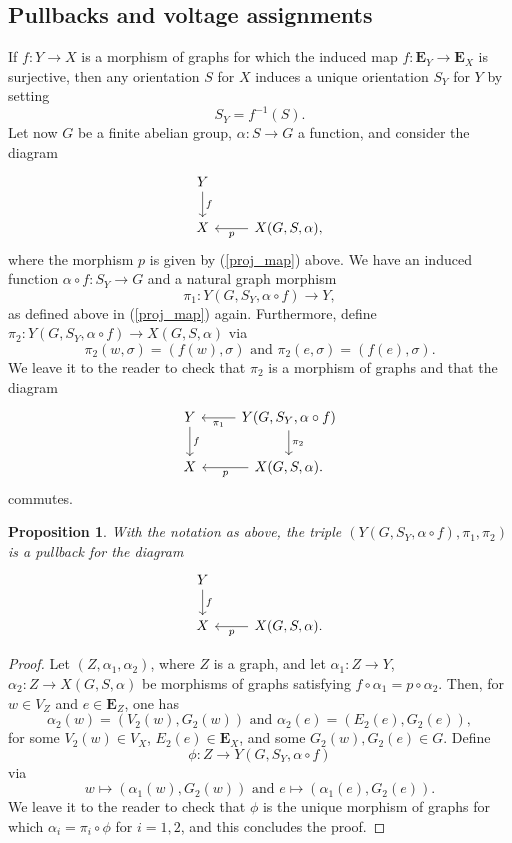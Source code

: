 \documentclass[11pt]{amsart}
\newtheorem{proposition}[theorem]{Proposition}
\numberwithin{equation}{section}
\theoremstyle{remark}
\begin{document}
\subsection{Pullbacks and voltage assignments} \label{pull_b_va}
If $f:Y\rightarrow X$ is a morphism of graphs for which the induced map $f:\mathbf{E}_{Y} \rightarrow \mathbf{E}_{X}$ is surjective, then any orientation $S$ for $X$ induces a unique orientation $S_{Y}$ for $Y$ by setting
$$S_{Y} = f^{-1}(S). $$
Let now $G$ be a finite abelian group, $\alpha:S \rightarrow G$ a function, and consider the diagram
\begin{equation*}
\begin{tikzcd}
Y \arrow["f",d] & \\
X & \arrow["p",l] X(G,S,\alpha),
\end{tikzcd}
\end{equation*}
where the morphism $p$ is given by (\ref{proj_map}) above.  We have an induced function $\alpha \circ f:S_{Y} \rightarrow G$ and a natural graph morphism
$$\pi_{1}:Y(G,S_{Y},\alpha \circ f) \rightarrow Y, $$
as defined above in (\ref{proj_map}) again.  Furthermore, define $\pi_{2}:Y(G,S_{Y},\alpha \circ f) \rightarrow X(G,S,\alpha)$ via
$$\pi_{2}(w,\sigma) = (f(w),\sigma) \text{ and } \pi_{2}(e,\sigma) = (f(e),\sigma). $$
We leave it to the reader to check that $\pi_{2}$ is a morphism of graphs and that the diagram
\begin{equation*}
\begin{tikzcd}
Y \arrow["f",d] & \arrow["\pi_{1}",l] \arrow["\pi_{2}",d] Y(G,S_{Y},\alpha \circ f) \\
X & \arrow["p",l] X(G,S,\alpha).
\end{tikzcd}
\end{equation*}
commutes.
\begin{proposition} \label{concrete_fiber}
With the notation as above, the triple $(Y(G,S_{Y},\alpha \circ f),\pi_{1},\pi_{2})$ is a pullback for the diagram
\begin{equation*}
\begin{tikzcd}
Y \arrow["f",d] & \\
X & \arrow["p",l] X(G,S,\alpha).
\end{tikzcd}
\end{equation*}
\end{proposition}
\begin{proof}
Let $(Z,\alpha_{1},\alpha_{2})$, where $Z$ is a graph, and let $\alpha_{1}:Z \rightarrow Y$, $\alpha_{2}:Z \rightarrow X(G,S,\alpha)$ be morphisms of graphs satisfying $f \circ \alpha_{1} = p \circ \alpha_{2}$.  Then, for $w \in V_{Z}$ and $e \in \mathbf{E}_{Z}$, one has
$$\alpha_{2}(w) =  (V_{2}(w), G_{2}(w)) \text{ and } \alpha_{2}(e) = (E_{2}(e), G_{2}(e)),$$
for some $V_{2}(w) \in V_{X}$, $E_{2}(e) \in \mathbf{E}_{X}$, and some $G_{2}(w), G_{2}(e) \in G$.  Define 
$$\phi:Z \rightarrow Y(G,S_{Y},\alpha \circ f)$$ 
via
$$w \mapsto (\alpha_{1}(w),G_{2}(w)) \text{ and } e \mapsto (\alpha_{1}(e), G_{2}(e)). $$
We leave it to the reader to check that $\phi$ is the unique morphism of graphs for which $\alpha_{i} = \pi_{i} \circ \phi$ for $i=1,2$, and this concludes the proof.
\end{proof}
\end{document}
